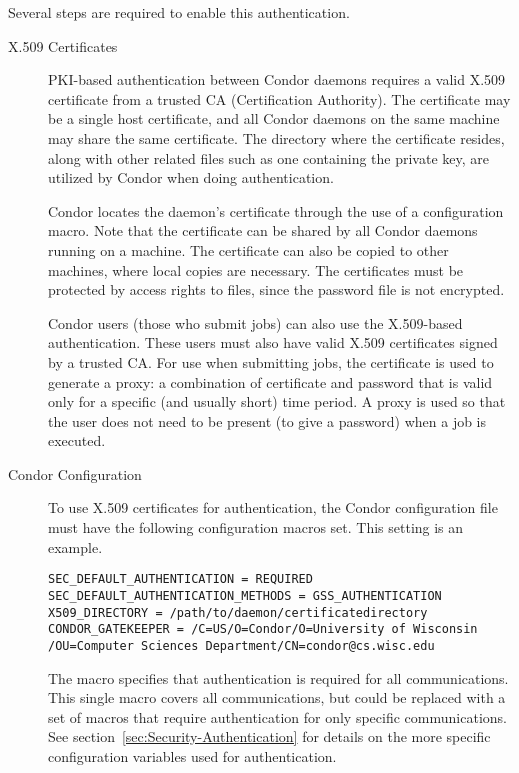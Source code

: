Several steps are required to enable this authentication.
\begin{description}
\item[X.509 Certificates]

PKI-based authentication between Condor daemons
requires
a valid X.509 certificate from a trusted
CA (Certification Authority).
The certificate may be a single host certificate,
and all Condor daemons on the same machine may share the same certificate.
The directory where the certificate resides, along with
other related files such as one containing the private key,
are utilized by Condor when doing authentication. 

Condor locates the daemon's certificate through the use of
a configuration macro.
Note that the certificate can be shared by all Condor daemons
running on a machine.
The certificate can also be copied to other machines,
where local copies are necessary.
The certificates must be protected by access rights to
files, since the password file is not encrypted.

Condor users (those who submit jobs) can also use
the X.509-based authentication.
These users must also
have valid X.509 certificates signed by a trusted CA.
For use when submitting jobs,
the certificate is used to generate a proxy:
a combination of certificate and password that is valid only
for a specific (and usually short) time period.
A proxy is used so that the user does  
not need to be present (to give a password) when a job is executed.

\item[Condor Configuration]

To use X.509 certificates for authentication, the Condor configuration file
must have the following configuration macros set.
This setting is an example.

\begin{verbatim}
SEC_DEFAULT_AUTHENTICATION = REQUIRED
SEC_DEFAULT_AUTHENTICATION_METHODS = GSS_AUTHENTICATION 
X509_DIRECTORY = /path/to/daemon/certificatedirectory
CONDOR_GATEKEEPER = /C=US/O=Condor/O=University of Wisconsin
/OU=Computer Sciences Department/CN=condor@cs.wisc.edu
\end{verbatim}

The
 macro specifies that
authentication is required for all communications.
This single macro covers all communications, but could be
replaced with a set of macros that require authentication for
only specific communications.
See section~\ref{sec:Security-Authentication} for details on the
more specific configuration variables used for authentication.


\end{description}
